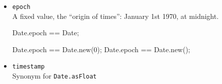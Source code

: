 \begin{itemize}
\item \lstinline|epoch|\\
  A fixed value, the ``origin of times'': January 1st 1970, at
  midnight.
\begin{urbiassert}[firstnumber=last]
Date.epoch == Date;

Date.epoch == Date.new(0);
Date.epoch == Date.new();
\end{urbiassert}

\item \lstinline|timestamp|\\
Synonym for \lstinline|Date.asFloat|

\end{itemize}


